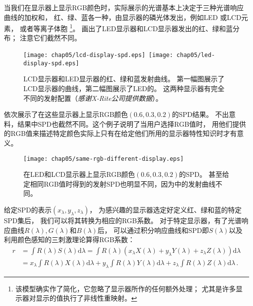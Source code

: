 当我们在显示器上显示RGB颜色时，实际展示的光谱基本上决定于三种光谱响应曲线的加权和，
红、绿、蓝各一种，由显示器的磷光体发出，例如LED
或LCD元素，
或者等离子体胞
\footnote{该模型确实作了简化，它忽略了显示器所作的任何额外处理；
    尤其是许多显示器对显示的值执行了非线性重映射。}。
画出了LED显示器和LCD显示器发出的红、绿和蓝分布；
注意它们截然不同。
\begin{figure}[htbp]
    \centering\texttt{[image: chap05/lcd-display-spd.eps]}\,
    \texttt{[image: chap05/led-display-spd.eps]}
    \caption{LCD显示器和LED显示器的红、绿和蓝发射曲线。
    第一幅图展示了LCD显示器的曲线，第二幅图展示了LED的。
    这两种显示器有完全不同的发射配置（{\itshape 感谢X-Rite公司提供数据}）。}
    \label{fig:5.4}
\end{figure}

依次展示了在这些显示器上显示RGB颜色$(0.6,0.3,0.2)$的SPD结果。
不出意料，结果中SPD也截然不同。这个例子说明了当用户选择RGB值时，
用他们提供的RGB值来描述特定颜色实际上只有在给定他们所用的显示器特性知识时才有意义。
\begin{figure}[htbp]
    \centering\texttt{[image: chap05/same-rgb-different-display.eps]}
    \caption{在LED和LCD显示器上显示RGB颜色$(0.6,0.3,0.2)$的SPD。
        甚至给定相同RGB值时得到的发射SPD也明显不同，因为中的发射曲线不同。}
    \label{fig:5.5}
\end{figure}

给定SPD的表示$(x_{\lambda},y_{\lambda},z_{\lambda})$，
为感兴趣的显示器选定好定义红、绿和蓝的特定SPD集后，
我们可以将其转换为相应的RGB系数。
对于特定显示器，有了光谱响应曲线$R(\lambda),G(\lambda)$和$B(\lambda)$后，
可以通过积分响应曲线和SPD即$S(\lambda)$以及利用颜色感知的三刺激理论算得RGB系数：
\begin{align*}
    r & =\int R(\lambda)S(\lambda)\mathrm{d}\lambda=\int R(\lambda)(x_{\lambda}X(\lambda)+y_{\lambda}Y(\lambda)+z_{\lambda}Z(\lambda))\mathrm{d}\lambda                        \\
      & =x_{\lambda}\int R(\lambda)X(\lambda)\mathrm{d}\lambda+y_{\lambda}\int R(\lambda)Y(\lambda)\mathrm{d}\lambda+z_{\lambda}\int R(\lambda)Z(\lambda)\mathrm{d}\lambda\, .
\end{align*}

